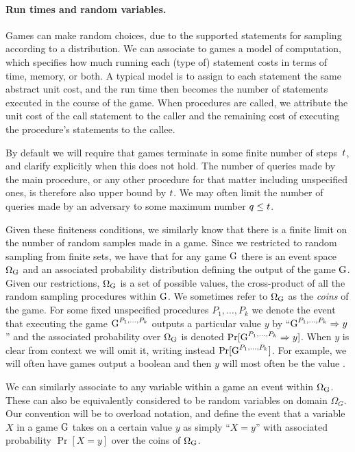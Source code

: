 \paragraph{Run times and random variables.} Games can make random choices, due
to the supported statements for sampling according to a distribution. We can
associate to games a model of computation, which specifies how much running each
(type of) statement costs in terms of time, memory, or both.   A typical model
is to assign to each statement the same abstract unit cost, and the run time
then becomes the number of statements executed in the course of the game. 
When procedures are called, we attribute the unit cost of the call statement to
the caller and the remaining cost of executing the procedure's statements to the
callee. 

By default we will require that games terminate in some finite number of
steps~$t$, and clarify explicitly when this does not hold. The number of
queries made by the main procedure, or any other procedure for that matter
including unspecified ones, is
therefore also upper bound by $t$. We  may often limit the number of
queries made by an adversary to some maximum number $q \le t$. 

Given these finiteness conditions, we similarly know that there is a finite
limit on the number of random samples made in a game. Since we restricted to 
random sampling from finite sets, we have that for any game ${{\textnormal G}}$ 
there is an event space~$\Omega_{{\textnormal G}}$ and an associated probability distribution
defining the output of the game ${{\textnormal G}}$. Given our restrictions, $\Omega_{{\textnormal G}}$ is a
set of possible values, the cross-product of all the random sampling procedures
within ${{\textnormal G}}$. We sometimes refer to $\Omega_{{\textnormal G}}$ as the \emph{coins} of the game.
For some fixed unspecified procedures
$P_1,\ldots,P_k$ we denote the event that executing the game
${{\textnormal G}}^{P_1,\ldots,P_k}$ outputs a particular value $y$ by
``${{\textnormal G}}^{P_1,\ldots,P_k}\Rightarrow y$'' and the associated probability over
$\Omega_{{\textnormal G}}$ is denoted $\Pr[{{\textnormal G}}^{P_1,\ldots,P_k}\Rightarrow y]$. When $y$ is clear
from context we will omit it, writing instead $\Pr[{{\textnormal G}}^{P_1,\ldots,P_k}]$.  
For example, we will often have games output a boolean and then
$y$ will most often be the value \true.

We can similarly associate to any variable within a game an event within
$\Omega_{{\textnormal G}}$. These can also be equivalently considered to be random variables on
domain $\Omega_G$. Our convention will be to overload notation, and define the
event that a variable $X$ in a game ${{\textnormal G}}$ takes on a certain value $y$ as simply
``$X = y$'' with associated probability $\Pr[X = y]$ over the coins of
$\Omega_{{\textnormal G}}$. 



